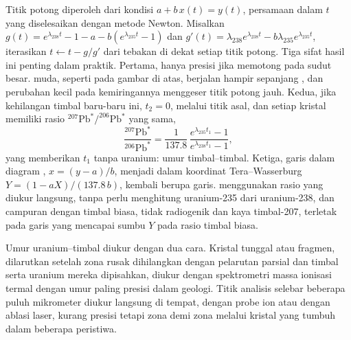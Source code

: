 Titik potong diperoleh dari kondisi $a + b\,x(t) = y(t)$, persamaan dalam $t$ yang
diselesaikan dengan metode Newton. Misalkan $g(t) = e^{\lambda_{238}t} - 1 - a -
b(e^{\lambda_{235}t} - 1)$ dan $g'(t) = \lambda_{238}e^{\lambda_{238}t} -
b\lambda_{235}e^{\lambda_{235}t}$, iterasikan $t \leftarrow t - g/g'$ dari tebakan
di dekat setiap titik potong. Tiga sifat hasil ini penting dalam praktik.
Pertama,  hanya presisi jika  memotong
 pada sudut besar.  muda, seperti pada gambar di atas, berjalan
hampir sepanjang , dan perubahan kecil pada kemiringannya menggeser
titik potong jauh. Kedua, jika kehilangan timbal baru-baru ini, $t_2 = 0$, 
melalui titik asal, dan setiap kristal memiliki
rasio $^{207}\mathrm{Pb}^*/^{206}\mathrm{Pb}^*$ yang sama,
\[
\frac{^{207}\mathrm{Pb}^*}{^{206}\mathrm{Pb}^*} = \frac{1}{137.8}\,
\frac{e^{\lambda_{235}t_1} - 1}{e^{\lambda_{238}t_1} - 1},
\]
yang memberikan $t_1$ tanpa uranium: umur timbal--timbal. Ketiga, garis dalam
diagram , $x = (y - a)/b$, menjadi dalam koordinat Tera--Wasserburg
$Y = (1 - aX)/(137.8\,b)$, kembali berupa garis. 
menggunakan rasio yang diukur langsung, tanpa perlu menghitung uranium-235
dari uranium-238, dan campuran dengan timbal biasa, tidak radiogenik dan kaya
timbal-207, terletak pada garis yang mencapai sumbu $Y$ pada rasio timbal
biasa.

Umur uranium--timbal diukur dengan dua cara. Kristal tunggal atau fragmen,
dilarutkan setelah zona rusak dihilangkan dengan pelarutan parsial
dan timbal serta uranium mereka dipisahkan, diukur dengan spektrometri massa ionisasi termal
dengan umur paling presisi dalam geologi. Titik analisis selebar beberapa puluh
mikrometer diukur langsung di tempat, dengan probe ion atau dengan
ablasi laser, kurang presisi tetapi zona demi zona melalui kristal yang tumbuh dalam
beberapa peristiwa.

